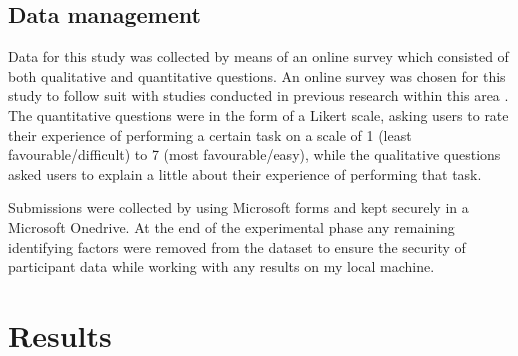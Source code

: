 \documentclass[lettersize,journal]{IEEEtran}
\begin{document}
	\subsection{Data management}
		Data for this study was collected by means of an online survey which consisted of both qualitative and quantitative questions. An online survey was chosen for this study to follow suit
		with studies conducted in previous research within this area  \cite{Liu2010}\cite{Baruah2012}\cite{Wang2011}\cite{Evans2014}\cite{Akram et al 2017}. The quantitative
		questions were in the form of a Likert scale, asking users to rate their experience of performing a certain task on a scale of 1 (least favourable/difficult)
		to 7 (most favourable/easy), while the qualitative questions asked users to explain a little about their experience of performing
		 that task.

		Submissions were collected by using Microsoft forms and kept securely in a Microsoft Onedrive. At the end of the experimental phase any remaining
		identifying factors were removed from the dataset to ensure the security of participant data while working with any results on my local machine.

\section{Results}
\end{document}
